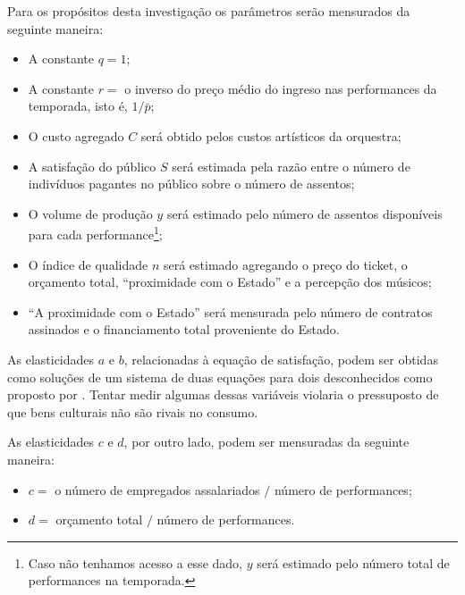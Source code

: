 \documentclass[a4paper, 12pt, openright, oneside, german, french, english, brazil]{abntex2}
\begin{document}
	Para os propósitos desta investigação os parâmetros serão mensurados da seguinte maneira:
	
	\begin{itemize}
		\item A constante $q = 1$;
		\item A constante $r =$ o inverso do preço médio do ingreso nas performances da temporada, isto é, $1/\bar{p}$;
		\item O custo agregado $C$ será obtido pelos custos artísticos da orquestra;
		\item A satisfação do público $S$ será estimada pela razão entre o número de indivíduos pagantes no público sobre o número de assentos;
		\item O volume de produção $y$ será estimado pelo número de assentos disponíveis para cada performance\footnote{Caso não tenhamos acesso a esse dado, $y$ será estimado pelo número total de performances na temporada.};
		\item O índice de qualidade $n$ será estimado agregando o preço do ticket, o orçamento total, ``proximidade com o Estado'' e a percepção dos músicos;
		\item ``A proximidade com o Estado'' será mensurada pelo número de contratos assinados e o financiamento total proveniente do Estado.
	\end{itemize}
	
	
	
	As elasticidades $a$ e $b$, relacionadas à equação de satisfação, podem ser obtidas como soluções de um sistema de duas equações para dois desconhecidos como proposto por . Tentar medir algumas dessas variáveis violaria o pressuposto de que bens culturais não são rivais no consumo.
	
	
	As elasticidades $c$ e $d$, por outro lado, podem ser mensuradas da seguinte maneira:
	
	\begin{itemize}
		\item $c =$ o número de empregados assalariados  $/$ número de performances;
		\item $d =$ orçamento total $/$ número de performances.
	\end{itemize}
	
\end{document}
